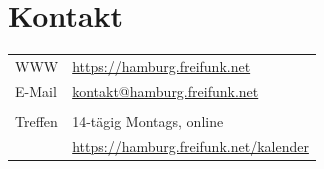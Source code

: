 \documentclass[10pt,a4paper,notumble]{leaflet}
\begin{document}
\section{Kontakt}
\begin{tabular}{ll}
WWW & \href{https://hamburg.freifunk.net}{https://hamburg.freifunk.net}\\
E-Mail & \href{mailto:kontakt@hamburg.freifunk.net}{kontakt@hamburg.freifunk.net}\\
        \\
Treffen & 14-tägig Montags, online\\
	& \href{https://hamburg.freifunk.net/kalender}{\small https://hamburg.freifunk.net/kalender}
\end{tabular}
\end{document}
